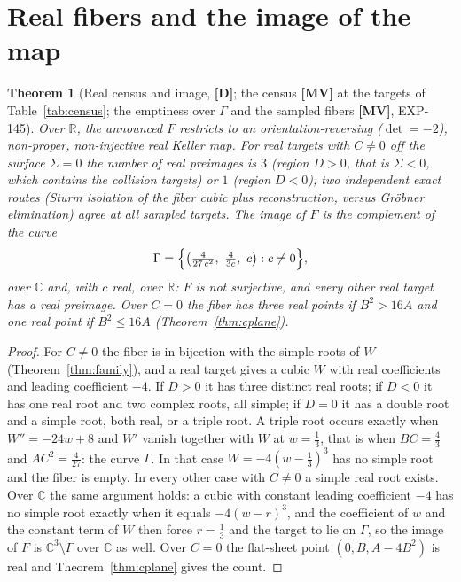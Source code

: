 \documentclass[11pt]{article}
\newtheorem{theorem}{Theorem}[section]
\theoremstyle{definition}
\theoremstyle{remark}
\newcommand{\C}{\mathbb{C}}
\newcommand{\R}{\mathbb{R}}
\newcommand{\MV}{\textbf{[MV]}}
\newcommand{\DD}{\textbf{[D]}}
\begin{document}
\section{Real fibers and the image of the map}\label{sec:real}

\begin{theorem}[Real census and image, {\DD}; the census {\MV} at the targets of Table~\ref{tab:census}; the emptiness over $\Gamma$ and the sampled fibers {\MV}, EXP-145]\label{thm:realcensus}
Over $\R$, the announced $F$ restricts to an orientation-reversing ($\det = -2$), non-proper, non-injective real Keller map. For real targets with $C \ne 0$ off the surface $\Sigma = 0$ the number of real preimages is $3$ (region $D > 0$, that is $\Sigma < 0$, which contains the collision targets) or $1$ (region $D < 0$); two independent exact routes (Sturm isolation of the fiber cubic plus reconstruction, versus Gr\"obner elimination) agree at all sampled targets. The image of $F$ is the complement of the curve
\begin{equation}\label{eq:gamma}
\Gamma = \Bigl\{\bigl(\tfrac{4}{27\,c^2},\ \tfrac{4}{3c},\ c\bigr) : c \neq 0\Bigr\},
\end{equation}
over $\C$ and, with $c$ real, over $\R$: $F$ is not surjective, and every other real target has a real preimage. Over $C = 0$ the fiber has three real points if $B^2 > 16A$ and one real point if $B^2 \le 16A$ (Theorem~\ref{thm:cplane}).
\end{theorem}

\begin{proof}
For $C \neq 0$ the fiber is in bijection with the simple roots of $W$ (Theorem~\ref{thm:family}), and a real target gives a cubic $W$ with real coefficients and leading coefficient $-4$. If $D > 0$ it has three distinct real roots; if $D < 0$ it has one real root and two complex roots, all simple; if $D = 0$ it has a double root and a simple root, both real, or a triple root. A triple root occurs exactly when $W'' = -24w + 8$ and $W'$ vanish together with $W$ at $w = \tfrac13$, that is when $BC = \tfrac43$ and $AC^2 = \tfrac{4}{27}$: the curve $\Gamma$. In that case $W = -4(w - \tfrac13)^3$ has no simple root and the fiber is empty. In every other case with $C \ne 0$ a simple real root exists. Over $\C$ the same argument holds: a cubic with constant leading coefficient $-4$ has no simple root exactly when it equals $-4(w - r)^3$, and the coefficient of $w$ and the constant term of $W$ then force $r = \tfrac13$ and the target to lie on $\Gamma$, so the image of $F$ is $\C^3 \setminus \Gamma$ over $\C$ as well. Over $C = 0$ the flat-sheet point $(0, B, A - 4B^2)$ is real and Theorem~\ref{thm:cplane} gives the count.
\end{proof}
\end{document}
